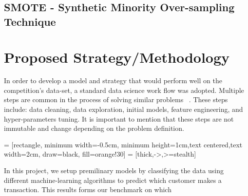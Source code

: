 \documentclass[journal,twoside,web]{ieeecolor}
\begin{document}
\subsection{SMOTE - Synthetic Minority Over-sampling Technique}






\section{Proposed Strategy/Methodology}
In order to develop a model and strategy that would perform well on the competition's data-set, a standard data science work flow was adopted. Multiple steps are common in the process of solving similar problems ~\cite{tandel_2017}. These steps include: data cleaning, data exploration, initial models, feature engineering, and hyper-parameters tuning. It is important to mention that these steps are not immutable and change depending on the problem definition.

 = [rectangle, minimum width=-0.5cm, minimum height=1cm,text centered,text width=2cm, draw=black, fill=orange!30]
 = [thick,->,>=stealth]

In this project, we setup premilinary models by  classifying the data using different machine-learning algorithms to predict which customer makes a transaction. This results forms our benchmark on which 
\end{document}
